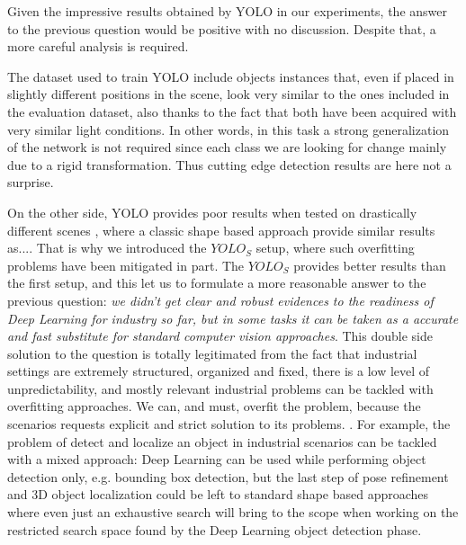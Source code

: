 Given the impressive results obtained by YOLO in our experiments, the answer to the previous question would be positive with no discussion. Despite that, a more careful analysis is required.

The dataset used to train YOLO include objects instances that, even if placed in slightly different positions in the scene, look very similar to the ones included in the evaluation dataset, also thanks to the fact that both have been acquired with very similar light conditions. In other words, in this task a strong generalization of the network is not required since each class we are looking for change mainly due to a rigid transformation. Thus cutting edge detection results are here not a surprise. 


On the other side, YOLO provides poor results when tested on drastically different scenes , where a classic shape based approach provide similar results as....
That is why we introduced the $YOLO_S$ setup, where such overfitting problems have been mitigated in part. The $YOLO_S$ provides better results than the first setup, and this let us to formulate a more reasonable answer to the previous question: \emph{we didn't get clear and robust evidences to the readiness of Deep Learning for industry so far, but in some tasks it can be taken as a accurate and fast substitute for standard computer vision approaches}. This double side solution to the question is totally legitimated from the fact that industrial settings are extremely structured, organized and fixed, there is a low level of unpredictability, and mostly relevant industrial problems can be tackled with overfitting approaches. We can, and must, overfit the problem, because the scenarios requests explicit and strict solution to its problems. 
.
For example, the problem of detect and localize an object in industrial scenarios can be tackled with a mixed approach: Deep Learning can be used while performing object detection only, e.g. bounding box detection, but the last step of pose refinement and 3D object localization could be left to standard shape based approaches where even just an exhaustive search will bring to the scope when working on the restricted search space found by the Deep Learning object detection phase.